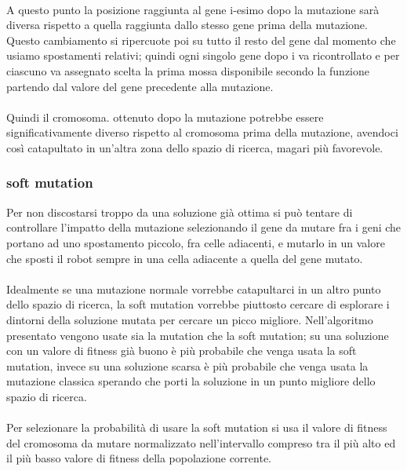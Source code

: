 \documentclass{article}
\begin{document}
\paragraph{}
A questo punto la posizione raggiunta al gene i-esimo dopo la mutazione sarà diversa rispetto a quella raggiunta dallo stesso gene prima della mutazione. Questo cambiamento si ripercuote poi su tutto il resto del gene dal momento che usiamo spostamenti relativi; quindi ogni singolo gene dopo i va ricontrollato e per ciascuno va assegnato scelta la prima mossa disponibile secondo la funzione partendo dal valore del gene precedente alla mutazione.
\paragraph{}
Quindi il cromosoma. ottenuto dopo la mutazione potrebbe essere significativamente diverso rispetto al cromosoma prima della mutazione, avendoci così catapultato in un'altra zona dello spazio di ricerca, magari più favorevole.

\subsubsection{soft mutation}
Per non discostarsi troppo da una soluzione già ottima si può tentare di controllare l'impatto della mutazione selezionando il gene da mutare fra i geni che portano ad uno spostamento piccolo, fra celle adiacenti, e mutarlo in un valore che sposti il robot sempre in una cella adiacente a quella del gene mutato.
\paragraph{}
Idealmente se una mutazione normale vorrebbe catapultarci in un altro punto dello spazio di ricerca, la soft mutation vorrebbe piuttosto cercare di esplorare i dintorni della soluzione mutata per cercare un picco migliore. Nell'algoritmo presentato vengono usate sia la mutation che la soft mutation; su una soluzione con un valore di fitness già buono è più probabile che venga usata la soft mutation, invece su una soluzione scarsa è più probabile che venga usata la mutazione classica sperando che porti la soluzione in un punto migliore dello spazio di ricerca.
\paragraph{}
Per selezionare la probabilità di usare la soft mutation si usa il valore di fitness del cromosoma da mutare normalizzato nell'intervallo compreso tra il più alto ed il più basso valore di fitness della popolazione corrente.
\end{document}
